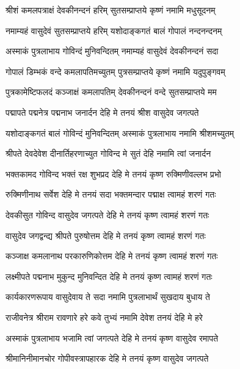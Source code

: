 

\twolineshloka
{श्रीशं कमलपत्राक्षं देवकीनन्दनं हरिम्}
{सुतसम्प्राप्तये कृष्णं नमामि मधुसूदनम्}%

\twolineshloka
{नमाम्यहं वासुदेवं सुतसम्प्राप्तये हरिम्}
{यशोदाङ्कगतं बालं गोपालं नन्दनन्दनम्}%

\twolineshloka
{अस्माकं पुत्रलाभाय गोविन्दं मुनिवन्दितम्}
{नमाम्यहं वासुदेवं देवकीनन्दनं सदा}%

\twolineshloka
{गोपालं डिम्भकं वन्दे कमलापतिमच्युतम्}
{पुत्रसम्प्राप्तये कृष्णं नमामि यदुपुङ्गवम्}%

\twolineshloka
{पुत्रकामेष्टिफलदं कञ्जाक्षं कमलापतिम्}
{देवकीनन्दनं वन्दे सुतसम्प्राप्तये मम}%

\twolineshloka
{पद्मापते पद्मनेत्र पद्मनाभ जनार्दन}
{देहि मे तनयं श्रीश वासुदेव जगत्पते}%

\twolineshloka
{यशोदाङ्कगतं बालं गोविन्दं मुनिवन्दितम्}
{अस्माकं पुत्रलाभाय नमामि श्रीशमच्युतम्}%

\twolineshloka
{श्रीपते देवदेवेश दीनार्तिहरणाच्युत}
{गोविन्द मे सुतं देहि नमामि त्वां जनार्दन}%

\twolineshloka
{भक्तकामद गोविन्द भक्तं रक्ष शुभप्रद}
{देहि मे तनयं कृष्ण रुक्मिणीवल्लभ प्रभो}%

\twolineshloka
{रुक्मिणीनाथ सर्वेश देहि मे तनयं सदा}
{भक्तमन्दार पद्माक्ष त्वामहं शरणं गतः}%

\twolineshloka
{देवकीसुत गोविन्द वासुदेव जगत्पते}
{देहि मे तनयं कृष्ण त्वामहं शरणं गतः}%

\twolineshloka
{वासुदेव जगद्वन्द्य श्रीपते पुरुषोत्तम}
{देहि मे तनयं कृष्ण त्वामहं शरणं गतः}%

\twolineshloka
{कञ्जाक्ष कमलानाथ परकारुणिकोत्तम}
{देहि मे तनयं कृष्ण त्वामहं शरणं गतः}%

\twolineshloka
{लक्ष्मीपते पद्मनाभ मुकुन्द मुनिवन्दित}
{देहि मे तनयं कृष्ण त्वामहं शरणं गतः}%

\twolineshloka
{कार्यकारणरूपाय वासुदेवाय ते सदा}
{नमामि पुत्रलाभार्थं सुखदाय बुधाय ते}%

\twolineshloka
{राजीवनेत्र श्रीराम रावणारे हरे कवे}
{तुभ्यं नमामि देवेश तनयं देहि मे हरे}%

\twolineshloka
{अस्माकं पुत्रलाभाय भजामि त्वां जगत्पते}
{देहि मे तनयं कृष्ण वासुदेव रमापते}%

\twolineshloka
{श्रीमानिनीमानचोर गोपीवस्त्रापहारक}
{देहि मे तनयं कृष्ण वासुदेव जगत्पते}%

